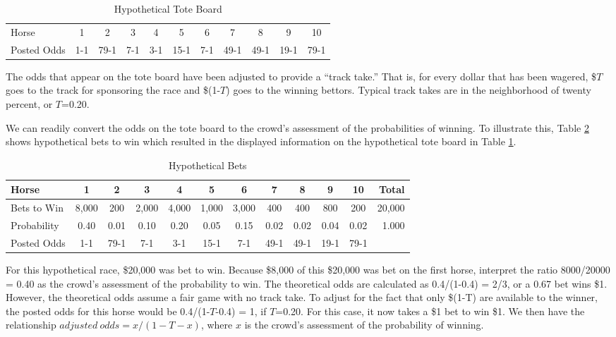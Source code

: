 \begin{exercises}
\begin{table}[h]
\caption{\label{Ex:HorseTote} \small Hypothetical Tote Board}
\begin{center}
\begin{tabular}{l|cccccccccc}
\hline
Horse & 1 & 2 & 3 & 4 & 5 & 6 & 7 & 8 & 9 & 10 \\
Posted Odds & 1-1 & 79-1 & 7-1 & 3-1 & 15-1 & 7-1 & 49-1 & 49-1 &
19-1 &
79-1 \\
\hline
\end{tabular}
\end{center}
\end{table}

The odds that appear on the tote board have been adjusted to provide
a ``track take.''  That is, for every dollar that has been wagered,
\$$T$ goes to the track for sponsoring the race and \$(1-$T$) goes
to the winning bettors. Typical track takes are in the neighborhood
of twenty percent, or $T$=0.20.

We can readily convert the odds on the tote board to the crowd's
assessment of the probabilities of winning. To illustrate this,
Table \ref{Ex:HorseBets} shows hypothetical bets to win which
resulted in the displayed information on the hypothetical tote board
in Table \ref{Ex:HorseTote}.

\begin{table}[h]
\caption{\label{Ex:HorseBets} \small Hypothetical Bets}
\begin{center}
\begin{tabular}{l|ccccccccccr}
\hline Horse & 1 & 2 & 3 & 4 & 5 & 6 & 7 & 8 & 9 & 10 & Total\\
\hline Bets to Win & 8,000 & 200 & 2,000 & 4,000 & 1,000 & 3,000 &
400 & 400 & 800 & 200 & 20,000 \\
Probability & 0.40 & 0.01 & 0.10 & 0.20 & 0.05 & 0.15 & 0.02 & 0.02
& 0.04 & 0.02 & 1.000 \\
Posted Odds & 1-1 & 79-1 & 7-1 & 3-1 & 15-1 & 7-1 & 49-1 & 49-1 &
19-1 &
79-1 \\
\hline
\end{tabular}
\end{center}
\end{table}

For this hypothetical race, \$20,000 was bet to win. Because \$8,000
of this \$20,000 was bet on the first horse, interpret the ratio
8000/20000 = 0.40 as the crowd's assessment of the probability to
win. The theoretical odds are calculated as 0.4/(1-0.4) = 2/3, or a
0.67 bet wins \$1. However, the theoretical odds assume a fair game
with no track take. To adjust for the fact that only \$(1-T) are
available to the winner, the posted odds for this horse would be
0.4/(1-$T$-0.4) =  1, if $T$=0.20. For this case, it now takes a \$1
bet to win \$1. We then have the relationship $adjusted~odds =
x/(1-T-x)$, where $x$ is the crowd's assessment of the probability
of winning.


\end{exercises}

